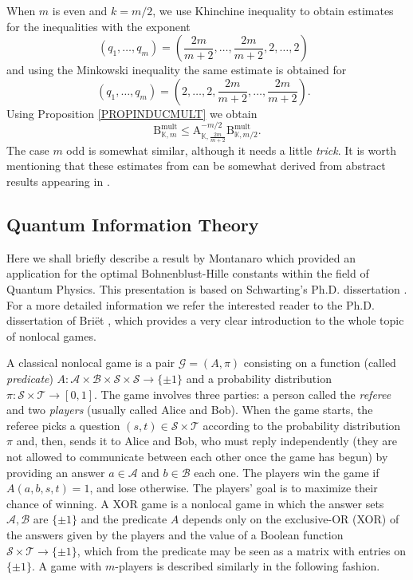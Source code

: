\documentclass[10pt]{amsart}
\numberwithin{equation}{section}
\begin{document}
When $m$ is even and $k=m/2$, we use Khinchine inequality to obtain
estimates for the inequalities with the exponent\begin{equation*}
\left( q_{1},\ldots ,q_{m}\right) =\left( \frac{2m}{m+2},\ldots ,\frac{2m}{m+2},2,\ldots ,2\right) \text{ }
\end{equation*}
and using the Minkowski inequality the same estimate is obtained for\begin{equation*}
\left( q_{1},\ldots ,q_{m}\right) =\left( 2,\ldots ,2,\frac{2m}{m+2},\ldots ,\frac{2m}{m+2}\right) .\text{ }
\end{equation*}Using Proposition \ref{PROPINDUCMULT} we obtain
\begin{equation*}
\mathrm{B}_{\mathbb{K},m}^{\mathrm{mult}}\leq \mathrm{A}_{\mathbb{K},\frac{2m}{m+2}}^{-m/2}\mathrm{B}_{\mathbb{K},m/2}^{\mathrm{mult}}.
\end{equation*}The case $m$ odd is somewhat similar, although it needs a little \emph{trick}. It is worth mentioning that these estimates from \cite{pseo} can be
somewhat derived from abstract results appearing in \cite{defa}.

\subsection{Quantum Information Theory}

Here we shall briefly describe a result by Montanaro \cite[Theorem 5]{Montanaro} which provided an application for the optimal Bohnenblust-Hille
constants within the field of Quantum Physics. This presentation is based on
Schwarting's Ph.D. dissertation \cite[Section 2.2.5]{ursula}. For a more
detailed information we refer the interested reader to the Ph.D.
dissertation of Bri\"et \cite[Chapter 1]{briet}, which provides a very clear
introduction to the whole topic of nonlocal games.

A classical nonlocal game is a pair $\mathcal{G} = \left(A,\pi\right)$
consisting on a function (called \emph{predicate}) $A : \mathcal{A} \times
\mathcal{B} \times \mathcal{S} \times \mathcal{S} \to \{\pm1\}$ and a
probability distribution $\pi : \mathcal{S} \times \mathcal{T} \to [0,1]$.
The game involves three parties: a person called the \emph{referee} and two
\emph{players} (usually called Alice and Bob). When the game starts, the
referee picks a question $(s,t) \in \mathcal{S} \times \mathcal{T}$
according to the probability distribution $\pi$ and, then, sends it to Alice
and Bob, who must reply independently (they are not allowed to communicate
between each other once the game has begun) by providing an answer $a\in\mathcal{A}$ and $b\in\mathcal{B}$ each one. The players win the game if $A(a,b,s,t)=1$, and lose otherwise. The players' goal is to maximize their
chance of winning. A XOR game is a nonlocal game in which the answer sets $\mathcal{A},\mathcal{B}$ are $\{\pm1\}$ and the predicate $A$ depends only
on the exclusive-OR (XOR) of the answers given by the players and the value
of a Boolean function $\mathcal{S} \times \mathcal{T} \to \{\pm1\}$, which
from the predicate may be seen as a matrix with entries on $\{\pm1\}$. A
game with $m$-players is described similarly in the following fashion.
\end{document}
